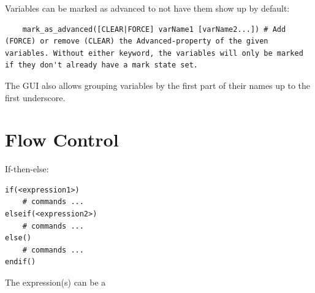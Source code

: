 \documentclass[table, xcdraw]{article}%
\begin{document}
\begin{itemize}
    Variables can be marked as advanced to not have them show up by default:
    
    \begin{verbatim}
    mark_as_advanced([CLEAR|FORCE] varName1 [varName2...]) # Add (FORCE) or remove (CLEAR) the Advanced-property of the given variables. Without either keyword, the variables will only be marked if they don't already have a mark state set.
    \end{verbatim}
    
    The GUI also allows grouping variables by the first part of their names up to the first underscore.
\end{itemize}

\section{Flow Control}

If-then-else:

\begin{verbatim}
if(<expression1>)
    # commands ...
elseif(<expression2>)
    # commands ...
else()
    # commands ...
endif()
\end{verbatim}

The expression(s) can be a
\end{document}
